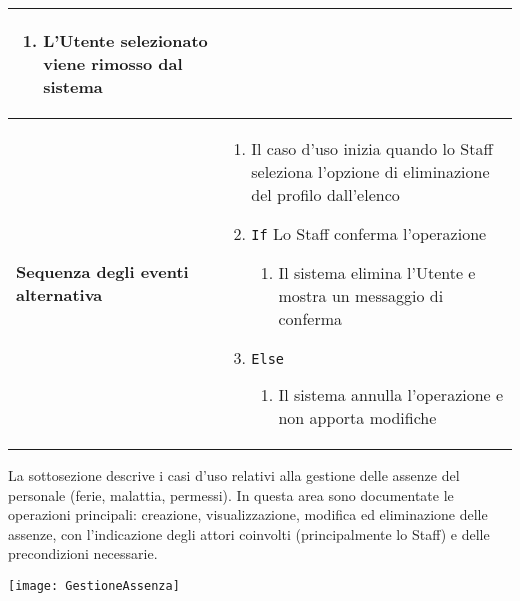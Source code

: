 \documentclass[a4paper]{report}
\begin{document}
\begin{table}[H]
\begin{tabular}{|p{3.9cm}|p{9.9cm}|}
\begin{enumerate}[leftmargin=14pt,label=\arabic*.,labelsep=0.5em,topsep=0pt,partopsep=0pt,parsep=0pt,itemsep=0pt]
    \begin{enumerate}[label=\arabic{enumi}.\arabic*.,leftmargin=22pt,labelsep=0.5em,topsep=0pt,partopsep=0pt,parsep=0pt,itemsep=0pt]
        \item L’Utente selezionato viene rimosso dal sistema
    \end{enumerate}
\end{enumerate} \\ \hline
\textbf{Sequenza degli eventi alternativa} & \begin{enumerate}[leftmargin=14pt,label=\arabic*.,labelsep=0.5em,topsep=0pt,partopsep=0pt,parsep=0pt,itemsep=0pt] 
    \item Il caso d'uso inizia quando lo Staff seleziona l'opzione di eliminazione del profilo dall'elenco
    \item \texttt{If} Lo Staff conferma l’operazione
    \begin{enumerate}[label=\arabic{enumi}.\arabic*.,leftmargin=22pt,labelsep=0.5em,topsep=0pt,partopsep=0pt,parsep=0pt,itemsep=0pt]
        \item Il sistema elimina l’Utente e mostra un messaggio di conferma
    \end{enumerate}
    \item \texttt{Else}
    \begin{enumerate}[label=\arabic{enumi}.\arabic*.,leftmargin=22pt,labelsep=0.5em,topsep=0pt,partopsep=0pt,parsep=0pt,itemsep=0pt]
        \item Il sistema annulla l’operazione e non apporta modifiche
\end{enumerate}
\end{enumerate}\\ \hline
\end{tabular}
\end{table}



\clearpage
{}

La sottosezione descrive i casi d'uso relativi alla gestione delle assenze del personale (ferie, malattia, permessi). In questa area sono documentate le operazioni principali: creazione, visualizzazione, modifica ed eliminazione delle assenze, con l'indicazione degli attori coinvolti (principalmente lo Staff) e delle precondizioni necessarie.

\begin{figure*}[ht]
    \centering
    \texttt{[image: GestioneAssenza]}
\end{figure*}
\end{document}

